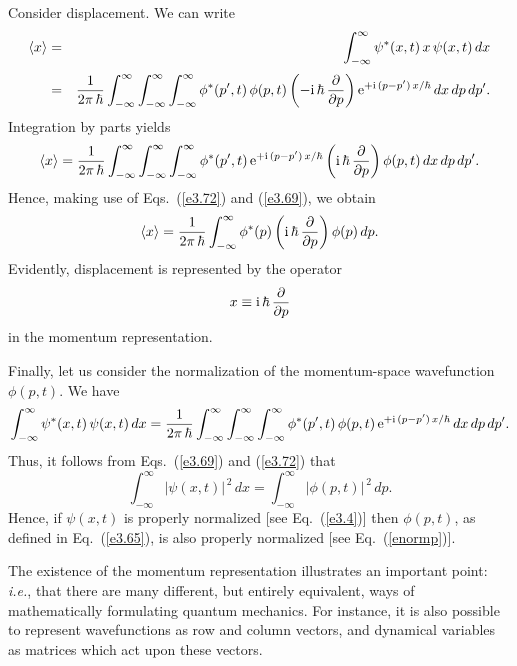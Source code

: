 Consider displacement. We can write
\begin{eqnarray}
\langle x\rangle& =& \int_{-\infty}^{\infty} \psi^\ast(x,t)\,x\,\psi(x,t)\,dx \\[0.5ex]&=& \frac{1}{2\pi\,\hbar}\int_{-\infty}^{\infty}\int_{-\infty}^{\infty}\int_{-\infty}^{\infty}
\phi^\ast(p',t)\,\phi(p,t)\left(-{\rm i}\,\hbar\,\frac{\partial}{\partial p}\right){\rm e}^{+{\rm i}\,(p-p')\,x/\hbar}\,dx\,dp\,dp'.\nonumber
\end{eqnarray}
Integration by parts yields
\begin{equation}
\langle x\rangle=  \frac{1}{2\pi\,\hbar}\int_{-\infty}^{\infty}\int_{-\infty}^{\infty}\int_{-\infty}^{\infty}
\phi^\ast(p',t)\,{\rm e}^{+{\rm i}\,(p-p')\,x/\hbar}\left({\rm i}\,\hbar\,\frac{\partial}{\partial p}\right)\phi(p,t)\,dx\,dp\,dp'.
\end{equation}
Hence, making use of Eqs.~(\ref{e3.72}) and (\ref{e3.69}), we obtain
\begin{equation}
\langle x\rangle=  \frac{1}{2\pi\,\hbar}\int_{-\infty}^{\infty}
\phi^\ast(p) \left({\rm i}\,\hbar\,\frac{\partial}{\partial p}\right)\phi(p)\,dp.
\end{equation}
Evidently, displacement is represented by the operator
\begin{equation}
x\equiv{\rm i}\,\hbar\,\frac{\partial}{\partial p}
\end{equation}
in the momentum representation.

Finally, let us consider the normalization of the momentum-space wavefunction $\phi(p,t)$. We have
\begin{equation}
\int_{-\infty}^{\infty} \psi^\ast(x,t)\,\psi(x,t)\,dx = \frac{1}{2\pi\,\hbar}\int_{-\infty}^{\infty}\int_{-\infty}^{\infty}\int_{-\infty}^{\infty}
\phi^\ast(p',t)\,\phi(p,t)\,{\rm e}^{+{\rm i}\,(p-p')\,x/\hbar}\,dx\,dp\,dp'.
\end{equation}
Thus, it follows from Eqs.~(\ref{e3.69}) and (\ref{e3.72})
that
\begin{equation}\label{e3.83}
\int_{-\infty}^{\infty} |\psi(x,t)|^{\,2}\,dx =\int_{-\infty}^{\infty}|\phi(p,t)|^{\,2}\,dp.
\end{equation}
Hence, if $\psi(x,t)$ is properly normalized [see Eq.~(\ref{e3.4})] then $\phi(p,t)$,
as defined in Eq.~(\ref{e3.65}), is also properly normalized [see Eq.~(\ref{enormp})].

The existence of the momentum representation illustrates an important point:
{\em i.e.}, that there are many different, but entirely equivalent, ways
of mathematically formulating quantum mechanics. For instance, it
is also possible to represent wavefunctions as row and column vectors, and dynamical
variables 
as matrices which act upon these vectors.

